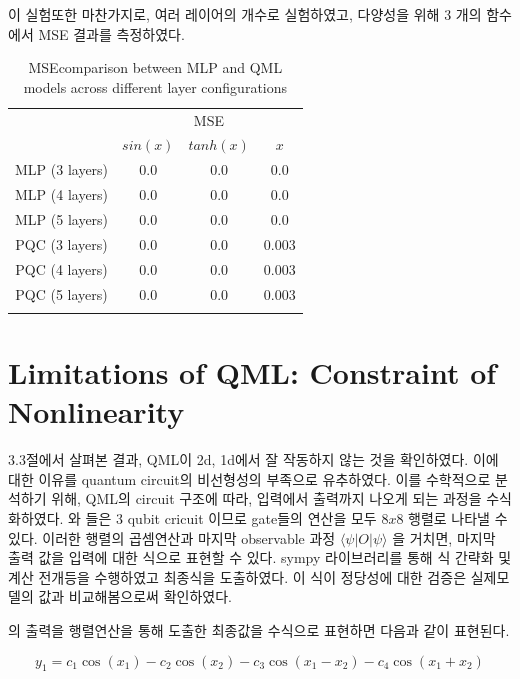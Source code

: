 이 실험또한 마찬가지로, 여러 레이어의 개수로 실험하였고, 다양성을 위해 3 개의 함수에서 MSE  결과를 측정하였다.

\begin{table}[ht]
    \centering
    \begin{tabular}{c|ccc}
    \Xhline{3\arrayrulewidth}
    \multirow{2}{*}{Layers} & \multicolumn{3}{c}{MSE} \\
    \cline{2-4}
    & $sin(x)$  & $tanh(x)$ & $x$ \\
    \hline
    MLP (3 layers) & 0.0 & 0.0 & 0.0 \\
    MLP (4 layers) & 0.0 & 0.0 & 0.0 \\
    MLP (5 layers) & 0.0 & 0.0 & 0.0 \\
    \hline
    PQC (3 layers) & 0.0 & 0.0 & 0.003 \\
    PQC (4 layers) & 0.0 & 0.0 & 0.003 \\
    PQC (5 layers) & 0.0 & 0.0 & 0.003 \\
    \Xhline{3\arrayrulewidth}
    \end{tabular}
    \caption{MSEcomparison between MLP and QML models across different layer configurations}
    \label{tab:mse_comparison}
\end{table}




\section{Limitations of QML: Constraint of Nonlinearity}

3.3절에서 살펴본 결과, QML이 2d, 1d에서 잘 작동하지 않는 것을 확인하였다. 이에 대한 이유를 quantum circuit의 비선형성의 부족으로 유추하였다. 이를 수학적으로 분석하기 위해, QML의 circuit 구조에 따라, 입력에서 출력까지 나오게 되는 과정을 수식화하였다.  와 들은 3 qubit cricuit 이므로 gate들의 연산을 모두 $8x8$ 행렬로 나타낼 수 있다. 이러한 행렬의 곱셈연산과 마지막 observable 과정 $ \langle \psi | O | \psi \rangle$ 을 거치면, 마지막 출력 값을 입력에 대한 식으로 표현할 수 있다.  sympy 라이브러리를 통해 식 간략화 및 계산 전개등을 수행하였고 최종식을 도출하였다. 이 식이 정당성에 대한 검증은 실제모델의 값과 비교해봄으로써 확인하였다.

  의 출력을 행렬연산을 통해 도출한 최종값을 수식으로 표현하면 다음과 같이 표현된다.

\begin{equation*}
    y_1  = c_1\cos{\left(x_{1} \right)} - c_2\cos{\left(x_{2} \right)} - c_3\cos{\left(x_{1} - x_{2} \right)} - c_4\cos{\left(x_{1} + x_{2} \right)}
\end{equation*}


